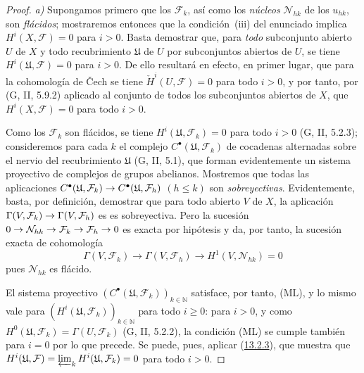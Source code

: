 \documentclass[10pt,oneside,openany]{book}
\theoremstyle{egaenv}\newtheorem*{env}{---}
\theoremstyle{egastatement}
\theoremstyle{egadescription}
\renewcommand{\leq}{\leqslant}
\renewcommand{\geq}{\geqslant}
\renewcommand{\to}{\mathchoice{\longrightarrow}{\rightarrow}{\rightarrow}{\rightarrow}}
\begin{document}
\begin{proof}
\emph{a)}
Supongamos primero que los $\mathcal F_k$, así como los \emph{núcleos}
$\mathcal N_{hk}$ de los $u_{hk}$, son \emph{flácidos}; mostraremos entonces que
la condición~{\rm(iii)} del enunciado implica
$H^i(X,\mathcal F)=0$ para $i>0$.
Basta demostrar que, para \emph{todo} subconjunto abierto $U$ de $X$ y todo
recubrimiento $\mathfrak U$ de $U$ por subconjuntos abiertos de $U$, se tiene $H^i(\mathfrak U,\mathcal F)=0$ para $i>0$. De ello resultará en efecto, en primer lugar, que para la cohomología de Čech se tiene
$\check H^i(U,\mathcal F)=0$ para todo $i>0$, y por tanto, por
(G, II, 5.9.2) aplicado al conjunto de todos los subconjuntos abiertos de
$X$, que $H^i(X,\mathcal F)=0$ para todo $i>0$.

Como los $\mathcal F_k$ son flácidos, se tiene
$H^i(\mathfrak U,\mathcal F_k)=0$ para todo $i>0$ (G, II, 5.2.3); consideremos para cada $k$ el complejo $C^\bullet(\mathfrak U,\mathcal F_k)$ de cocadenas
alternadas sobre el nervio del recubrimiento $\mathfrak U$ (G, II, 5.1), que forman evidentemente un sistema proyectivo de complejos de grupos abelianos. Mostremos que todas las aplicaciones $C^\bullet(\mathfrak U,\mathcal F_k)\to
C^\bullet(\mathfrak U,\mathcal F_h)$ $(h\leq k)$ son \emph{sobreyectivas}. Evidentemente, basta, por definición, demostrar que para todo abierto $V$
de $X$, la aplicación
$\Gamma(V,\mathcal F_k)\to\Gamma(V,\mathcal F_h)$ es
es sobreyectiva. Pero la sucesión
$0\to\mathcal N_{hk}\to\mathcal F_k\to\mathcal F_h\to0$
es exacta por hipótesis y da, por tanto, la sucesión exacta de
cohomología
\[
\Gamma(V,\mathcal F_k)\longrightarrow\Gamma(V,\mathcal F_h)
\longrightarrow H^1(V,\mathcal N_{hk})=0
\]
pues $\mathcal N_{hk}$ es flácido.

El sistema proyectivo
$(C^\bullet(\mathfrak U,\mathcal F_k))_{k\in\mathbb N}$
satisface, por tanto, (ML), y lo mismo vale para
$(H^i(\mathfrak U,\mathcal F_k))_{k\in\mathbb N}$ para todo $i\geq0$:
para $i>0$, y como $H^0(\mathfrak U,\mathcal F_k)=\Gamma(U,\mathcal F_k)$
(G, II, 5.2.2), la condición (ML) se cumple también para $i=0$ por lo que precede. Se puede, pues, aplicar (\hyperref[0.13.2.3-fr]{13.2.3}), que muestra que $H^i(\mathfrak U,\mathcal F)=\varprojlim_k H^i(\mathfrak U,\mathcal F_k)=0$ para todo $i>0$.


\end{proof}
\end{document}
